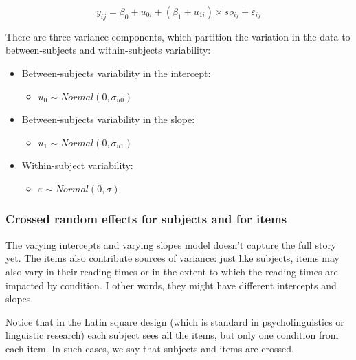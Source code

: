 \documentclass[
  12pt,
]{krantz}
\providecommand{\tightlist}{%
  \setlength{\itemsep}{0pt}\setlength{\parskip}{0pt}}
\theoremstyle{definition}
\theoremstyle{definition}
\theoremstyle{definition}
\theoremstyle{definition}
\theoremstyle{remark}
\begin{document}
\begin{equation}
y_{ij} = \beta_0 + u_{0i}+(\beta_1+u_{1i})\times so_{ij} + \varepsilon_{ij}
\end{equation}

There are three variance components, which partition the variation in the data to between-subjects and within-subjects variability:

\begin{itemize}
\tightlist
\item
  Between-subjects variability in the intercept:

  \begin{itemize}
  \tightlist
  \item
    \(u_0 \sim Normal(0,\sigma_{u0})\)
  \end{itemize}
\item
  Between-subjects variability in the slope:

  \begin{itemize}
  \tightlist
  \item
    \(u_1 \sim Normal(0,\sigma_{u1})\)
  \end{itemize}
\item
  Within-subject variability:

  \begin{itemize}
  \tightlist
  \item
    \(\varepsilon \sim Normal(0,\sigma)\)
  \end{itemize}
\end{itemize}

\hypertarget{crossed-random-effects-for-subjects-and-for-items}{%
\subsubsection{Crossed random effects for subjects and for items}\label{crossed-random-effects-for-subjects-and-for-items}}

The varying intercepts and varying slopes model doesn't capture the full story yet. The items also contribute sources of variance: just like subjects, items may also vary in their reading times or in the extent to which the reading times are impacted by condition. I other words, they might have different intercepts and slopes.

Notice that in the Latin square design (which is standard in psycholinguistics or linguistic research) each subject sees all the items, but only one condition from each item. In such cases, we say that subjects and items are crossed.
\end{document}

